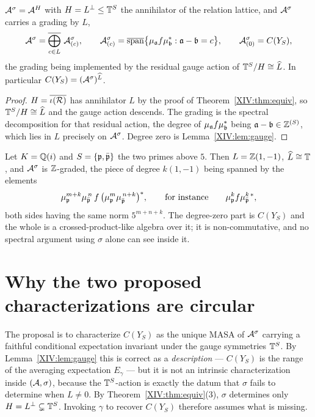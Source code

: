 \begin{theorem}\label{XIV:thm:structure}
$\mathcal{A}^\sigma=\mathcal{A}^{H}$ with $H=L^\perp\le\mathbb{T}^S$ the annihilator of the relation lattice, and
$\mathcal{A}^\sigma$ carries a grading by $L$,
\[
\cA^\sigma=\overline{\bigoplus_{c\in L}}\ \cA^\sigma_{(c)},
\qquad
\cA^\sigma_{(c)}=\overline{\spn}\bigl\{\mu_\aaa f\mu_\bb^*:\aaa-\bb=c\bigr\},
\qquad
\cA^\sigma_{(0)}=C(Y_S),
\]
the grading being implemented by the residual gauge action of
$\mathbb{T}^S/H\cong\widehat L$. In particular $C(Y_S)=(\mathcal{A}^\sigma)^{\widehat L}$.
\end{theorem}

\begin{proof}
$H=\overline{\iota(\mathcal{R})}$ has annihilator $L$ by the proof of Theorem~\ref{XIV:thm:equiv}, so
$\mathbb{T}^S/H\cong\widehat L$ and the gauge action descends. The grading is the spectral
decomposition for that residual action, the degree of $\mu_{\mathfrak{a}} f\mu_{\mathfrak{b}}^*$ being
$\mathfrak{a}-\mathfrak{b}\in\mathbb{Z}^{(S)}$, which lies in $L$ precisely on $\mathcal{A}^\sigma$. Degree zero is
Lemma~\ref{XIV:lem:gauge}.
\end{proof}

\begin{example}\label{XIV:ex:Qi}
Let $K=\mathbb{Q}(i)$ and $S=\{\mathfrak{p},\bar{\mathfrak{p}}\}$ the two primes above $5$. Then $L=\mathbb{Z}(1,-1)$,
$\widehat L\cong\mathbb{T}$, and $\mathcal{A}^\sigma$ is $\mathbb{Z}$-graded, the piece of degree $k(1,-1)$ being
spanned by the elements
\[
\mu_{\mathfrak{p}}^{m+k}\mu_{\bar{\mathfrak{p}}}^{\,n}\,f\,\bigl(\mu_{\mathfrak{p}}^{m}\mu_{\bar{\mathfrak{p}}}^{\,n+k}\bigr)^*,
\qquad\text{for instance}\qquad \mu_{\mathfrak{p}}^{k}f\mu_{\bar{\mathfrak{p}}}^{k\,*},
\]
both sides having the same norm $5^{m+n+k}$. The degree-zero part is $C(Y_S)$ and the
whole is a crossed-product-like algebra over it; it is non-commutative, and no spectral
argument using $\sigma$ alone can see inside it.
\end{example}

\section{Why the two proposed characterizations are circular}

\begin{remark}[Property A]\label{XIV:rem:A}
The proposal is to characterize $C(Y_S)$ as the unique MASA of $\mathcal{A}^\sigma$ carrying a
faithful conditional expectation invariant under the gauge symmetries $\mathbb{T}^S$. By
Lemma~\ref{XIV:lem:gauge} this is correct as a \emph{description} --- $C(Y_S)$ is the range of the
averaging expectation $E_\gamma$ --- but it is not an intrinsic characterization inside
$(\mathcal{A},\sigma)$, because the $\mathbb{T}^S$-action is exactly the datum that $\sigma$ fails to
determine when $L\ne0$. By Theorem~\ref{XIV:thm:equiv}(3), $\sigma$ determines only
$H=L^\perp\subsetneq\mathbb{T}^S$. Invoking $\gamma$ to recover $C(Y_S)$ therefore assumes what is
missing.
\end{remark}


